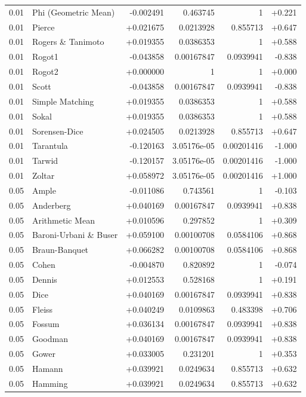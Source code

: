 \begin{longtable}{llrrrr}
0.01 & Phi (Geometric Mean) & -0.002491 & 0.463745 & 1 & +0.221 \\
0.01 & Pierce & +0.021675 & 0.0213928 & 0.855713 & +0.647 \\
0.01 & Rogers \& Tanimoto & +0.019355 & 0.0386353 & 1 & +0.588 \\
0.01 & Rogot1 & -0.043858 & 0.00167847 & 0.0939941 & -0.838 \\
0.01 & Rogot2 & +0.000000 & 1 & 1 & +0.000 \\
0.01 & Scott & -0.043858 & 0.00167847 & 0.0939941 & -0.838 \\
0.01 & Simple Matching & +0.019355 & 0.0386353 & 1 & +0.588 \\
0.01 & Sokal & +0.019355 & 0.0386353 & 1 & +0.588 \\
0.01 & Sorensen-Dice & +0.024505 & 0.0213928 & 0.855713 & +0.647 \\
0.01 & Tarantula & -0.120163 & 3.05176e-05 & 0.00201416 & -1.000 \\
0.01 & Tarwid & -0.120157 & 3.05176e-05 & 0.00201416 & -1.000 \\
0.01 & Zoltar & +0.058972 & 3.05176e-05 & 0.00201416 & +1.000 \\
0.05 & Ample & -0.011086 & 0.743561 & 1 & -0.103 \\
0.05 & Anderberg & +0.040169 & 0.00167847 & 0.0939941 & +0.838 \\
0.05 & Arithmetic Mean & +0.010596 & 0.297852 & 1 & +0.309 \\
0.05 & Baroni-Urbani \& Buser & +0.059100 & 0.00100708 & 0.0584106 & +0.868 \\
0.05 & Braun-Banquet & +0.066282 & 0.00100708 & 0.0584106 & +0.868 \\
0.05 & Cohen & -0.004870 & 0.820892 & 1 & -0.074 \\
0.05 & Dennis & +0.012553 & 0.528168 & 1 & +0.191 \\
0.05 & Dice & +0.040169 & 0.00167847 & 0.0939941 & +0.838 \\
0.05 & Fleiss & +0.040249 & 0.0109863 & 0.483398 & +0.706 \\
0.05 & Fossum & +0.036134 & 0.00167847 & 0.0939941 & +0.838 \\
0.05 & Goodman & +0.040169 & 0.00167847 & 0.0939941 & +0.838 \\
0.05 & Gower & +0.033005 & 0.231201 & 1 & +0.353 \\
0.05 & Hamann & +0.039921 & 0.0249634 & 0.855713 & +0.632 \\
0.05 & Hamming & +0.039921 & 0.0249634 & 0.855713 & +0.632 \\

\end{longtable}
